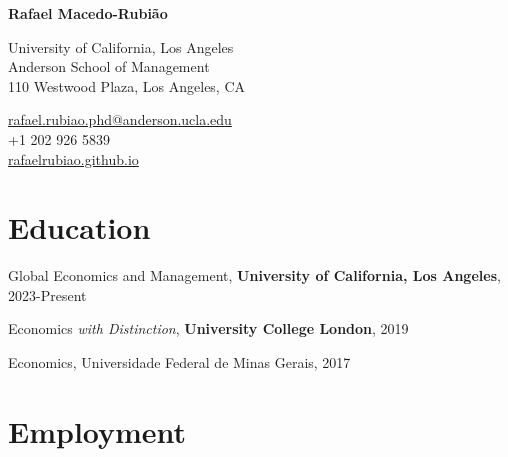 \documentclass[11pt,letterpaper]{report}
\newcommand{\myname}{Rafael Macedo-Rubi\~ao}
\newcommand{\namefont}[1]{{\normalfont\bfseries\Huge{#1}}}
\begin{document}
    \raggedright{}

    \textbf{\namefont{\myname}}

    \vspace{1em}
    \begin{minipage}[t]{0.700\textwidth}
       University of California, Los Angeles \\
      Anderson School of Management \\
        110 Westwood Plaza, Los Angeles, CA
    \end{minipage}
    \begin{minipage}[t]{0.295\textwidth}
        \flushright{}
        \href{mailto:rafael.rubiao.phd@anderson.ucla.edu}{rafael.rubiao.phd@anderson.ucla.edu} \\
        +1 202 926 5839 \\
        \href{https://rafaelrubiao.github.io}{rafaelrubiao.github.io}
    \end{minipage}


    \section*{Education}

    \begin{tablist}
        \item[PhD]  \tab{}Global Economics and Management, \textbf{University of California, Los Angeles}, 2023-Present \\
        \item[MSc]  \tab{}Economics \textit{with Distinction}, \textbf{University College London}, 2019 \\
        \item[BSc]  \tab{}Economics, Universidade Federal de Minas Gerais, 2017%

    \end{tablist}


    \section*{Employment}
\end{document}
